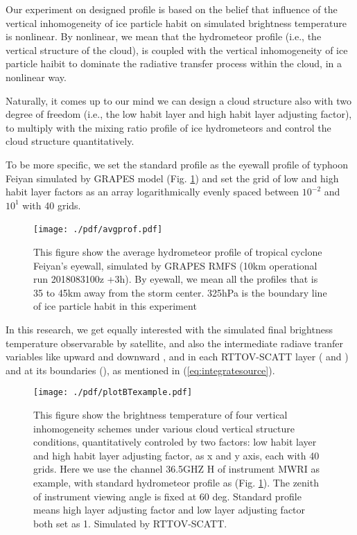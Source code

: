 \documentclass[a4paper]{report}
\begin{document}
Our experiment on designed profile is based on the belief that influence of the vertical inhomogeneity 
of ice particle habit on simulated brightness temperature is nonlinear. By nonlinear, we mean that 
the hydrometeor profile (i.e., the vertical structure of the cloud), is coupled with the vertical inhomogeneity 
of ice particle haibit to dominate the radiative transfer process within the cloud, in a nonlinear way.

Naturally, it comes up to our mind we can design a cloud structure also with two degree of freedom (i.e., 
the low habit layer and high habit layer adjusting factor), to multiply with the mixing ratio profile of
ice hydrometeors and control the cloud structure quantitatively.

To be more specific, we set the standard profile as the eyewall profile of typhoon Feiyan 
simulated by GRAPES model (Fig. \ref{fig:stdprofile}) and set the grid of low and high habit layer factors 
as an array logarithmically evenly spaced between $10^{-2}$ and $10^{1}$ with 40 grids.



\begin{figure}[hb] \label{fig:stdprofile}
\centering
\texttt{[image: ./pdf/avgprof.pdf]} 
\caption{This figure show the average hydrometeor profile of 
tropical cyclone Feiyan's eyewall, simulated by GRAPES RMFS (10km operational run 2018083100z +3h).
By eyewall, we mean all the profiles that is 35 to 45km away from the storm center.
325hPa is the boundary line of ice particle habit in this experiment}
\end{figure}

In this research, we get equally interested with the simulated final brightness temperature observarable by satellite,
and also the intermediate radiave tranfer variables like upward and downward ,  and
 in each RTTOV-SCATT layer ( and ) and at its boundaries (), 
as mentioned in (\ref{eq:integratesource}).

\begin{figure}[hb] \label{fig:exBT}
\centering
\texttt{[image: ./pdf/plotBTexample.pdf]}
\caption{This figure show the brightness temperature of four vertical inhomogeneity schemes under various cloud vertical 
structure conditions, quantitatively controled by two factors: low habit layer and high habit layer adjusting factor, 
as x and y axis, each with 40 grids. Here we use the channel 36.5GHZ H of instrument MWRI as example, with standard hydrometeor 
profile as (Fig. \ref{fig:stdprofile}). The zenith of instrument viewing angle is fixed at 60 deg.
Standard profile means high layer adjusting factor and low layer adjusting factor both set as 1.
Simulated by RTTOV-SCATT.}
\end{figure}
\end{document}
